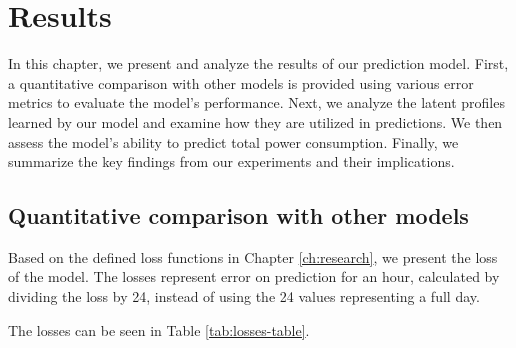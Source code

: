 \setchapterpreamble[u]{\margintoc}
\chapter{Results}
\label{ch:results}

In this chapter, we present and analyze the results of our prediction model. First, a quantitative comparison with other models is provided using various error metrics to evaluate the model's performance. Next, we analyze the latent profiles learned by our model and examine how they are utilized in predictions. We then assess the model's ability to predict total power consumption. Finally, we summarize the key findings from our experiments and their implications.

\section{Quantitative comparison with other models}
\label{sec:res-comparison}


Based on the defined loss functions in Chapter \ref{ch:research}, we present the loss of the model. The losses represent error on prediction for an hour, calculated by dividing the loss by 24, instead of using the 24 values representing a full day.

The losses can be seen in Table \ref{tab:losses-table}.

